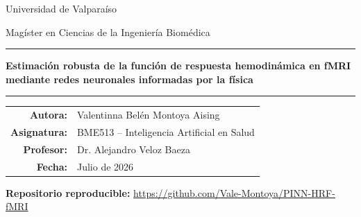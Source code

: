 \documentclass[11pt,a4paper,oneside]{report}
\newcommand{\projecttitle}{Estimación robusta de la función de respuesta hemodinámica en fMRI mediante redes neuronales informadas por la física}
\newcommand{\authorname}{Valentinna Belén Montoya Aising}
\newcommand{\programname}{Magíster en Ciencias de la Ingeniería Biomédica}
\newcommand{\coursename}{BME513 -- Inteligencia Artificial en Salud}
\newcommand{\professorname}{Dr. Alejandro Veloz Baeza}
\newcommand{\repositoryurl}{https://github.com/Vale-Montoya/PINN-HRF-fMRI}
\begin{document}
\hypersetup{pageanchor=false}

\begin{titlepage}
\centering
{\large Universidad de Valparaíso\par}
\vspace{0.25cm}
{\large \programname\par}
\vspace{1.35cm}
{\color{uvblue}\rule{\linewidth}{1.3pt}\par}
\vspace{0.65cm}
{\LARGE\bfseries \projecttitle\par}
\vspace{0.65cm}
{\color{uvblue}\rule{\linewidth}{1.3pt}\par}
\vfill
\begin{tabular}{rl}
\textbf{Autora:} & \authorname \\
\textbf{Asignatura:} & \coursename \\
\textbf{Profesor:} & \professorname \\
\textbf{Fecha:} & Julio de 2026 \\
\end{tabular}
\vfill
\begin{minipage}{0.92\textwidth}
\centering
\textbf{Repositorio reproducible:} \url{\repositoryurl}
\end{minipage}
\end{titlepage}
\hypersetup{pageanchor=true}


\clearpage
\tableofcontents
\clearpage
\listoffigures
\clearpage
\listoftables
\clearpage


\clearpage
{}












\appendix






\clearpage

\end{document}
